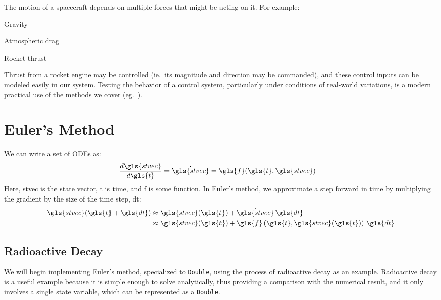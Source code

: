 \documentclass[12pt,openany]{book}
\begin{document}
The motion of a spacecraft depends on multiple forces that might be acting on it. For example:
\begin{compactitem}
\item Gravity
\item Atmospheric drag
\item Rocket thrust
\end{compactitem}
Thrust from a rocket engine may be controlled (ie.\ its magnitude and direction may be commanded), and these control inputs can be modeled easily in our system. Testing the behavior of a control system, particularly under conditions of real-world variations, is a modern practical use of the methods we cover (eg.~\cite{prince2011, brauer1977}).

\section{Euler's Method}

We can write a set of ODEs as:
\begin{align}
  \frac{d\gls{stvec}}{d\gls{t}} &= \dot{\gls{stvec}} = \gls{f}(\gls{t}, \gls{stvec})
\end{align}
Here, \gls{stvec} is the state vector, \gls{t} is time, and \gls{f} is some function. In Euler's method, we approximate a step forward in time by multiplying the gradient by the size of the time step, \gls{dt}:
\begin{align}
  \gls{stvec}(\gls{t} + \gls{dt})
  &\approx \gls{stvec}(\gls{t}) + \dot{\gls{stvec}}\,\gls{dt} \\
  &\approx \gls{stvec}(\gls{t}) + \gls{f}\left(\gls{t}, \gls{stvec}(\gls{t})\right)\,\gls{dt}
\end{align}

\subsection{Radioactive Decay}

We will begin implementing Euler's method, specialized to \texttt{Double}, using the process of radioactive decay as an example. Radioactive decay is a useful example because it is simple enough to solve analytically, thus providing a comparison with the numerical result, and it only involves a single state variable, which can be represented as a \texttt{Double}.
\end{document}
